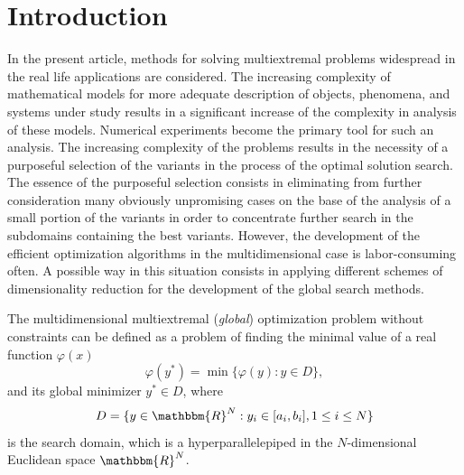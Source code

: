 \documentclass[smallextended]{svjour3}
\begin{document}
\section{Introduction}
\label{intro}
In the present article, methods for solving multiextremal problems widespread in the real life applications are considered. The increasing complexity of mathematical models for more adequate description of objects, phenomena, and systems under study results in a significant increase of the complexity in analysis of  these models. Numerical experiments become the primary tool for such an analysis. The increasing complexity of the problems results in the necessity of a purposeful selection of the variants in the process of the optimal solution search. The essence of the purposeful selection consists in eliminating from further consideration many obviously unpromising cases on the base of the analysis of a small portion of the variants in order to concentrate further search in the subdomains containing the best variants. However, the development of the efficient optimization algorithms in the multidimensional case is labor-consuming often. A possible way in this situation consists in applying different schemes of dimensionality reduction for the development of the global search methods.

The multidimensional multiextremal (\textit{global}) optimization problem without constraints can be defined as a problem of finding the minimal value of a real function $\varphi(x)$
%
\begin{equation}
\label{eq:1}
\varphi(y^*) = \min \{ \varphi(y): y \in D \},
\end{equation}
%
and its global minimizer $y^* \in D$, where
%
\begin{equation}
\label{eq:2}
D = \{ y \in \mathbbm{R}^N : y_i \in [a_i, b_i],  1 \leq i \leq N \}
\end{equation}
%
is the search domain, which  is a hyperparallelepiped in the $N$-dimensional Euclidean space $\mathbbm{R}^N$.
\end{document}

